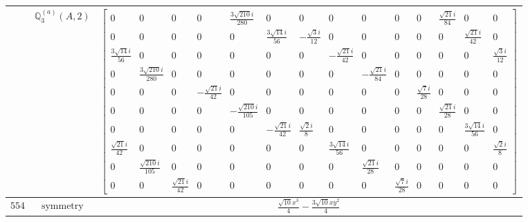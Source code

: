 \documentclass[fleqn,8pt,landscape]{jsarticle}
\begin{document}
\begin{longtable}{ccc}
$  $ & $ \mathbb{Q}_{3}^{(a)}(A,2) $ & $ \begin{bmatrix} 0 & 0 & 0 & 0 & \frac{3 \sqrt{210} i}{280} & 0 & 0 & 0 & 0 & 0 & 0 & \frac{\sqrt{21} i}{84} & 0 & 0 \\ 0 & 0 & 0 & 0 & 0 & \frac{3 \sqrt{14} i}{56} & - \frac{\sqrt{3} i}{12} & 0 & 0 & 0 & 0 & 0 & \frac{\sqrt{21} i}{42} & 0 \\ \frac{3 \sqrt{14} i}{56} & 0 & 0 & 0 & 0 & 0 & 0 & - \frac{\sqrt{21} i}{42} & 0 & 0 & 0 & 0 & 0 & \frac{\sqrt{3} i}{12} \\ 0 & \frac{3 \sqrt{210} i}{280} & 0 & 0 & 0 & 0 & 0 & 0 & - \frac{\sqrt{21} i}{84} & 0 & 0 & 0 & 0 & 0 \\ 0 & 0 & 0 & - \frac{\sqrt{21} i}{42} & 0 & 0 & 0 & 0 & 0 & 0 & \frac{\sqrt{7} i}{28} & 0 & 0 & 0 \\ 0 & 0 & 0 & 0 & - \frac{\sqrt{210} i}{105} & 0 & 0 & 0 & 0 & 0 & 0 & \frac{\sqrt{21} i}{28} & 0 & 0 \\ 0 & 0 & 0 & 0 & 0 & - \frac{\sqrt{21} i}{42} & \frac{\sqrt{2} i}{8} & 0 & 0 & 0 & 0 & 0 & \frac{3 \sqrt{14} i}{56} & 0 \\ \frac{\sqrt{21} i}{42} & 0 & 0 & 0 & 0 & 0 & 0 & \frac{3 \sqrt{14} i}{56} & 0 & 0 & 0 & 0 & 0 & \frac{\sqrt{2} i}{8} \\ 0 & \frac{\sqrt{210} i}{105} & 0 & 0 & 0 & 0 & 0 & 0 & \frac{\sqrt{21} i}{28} & 0 & 0 & 0 & 0 & 0 \\ 0 & 0 & \frac{\sqrt{21} i}{42} & 0 & 0 & 0 & 0 & 0 & 0 & \frac{\sqrt{7} i}{28} & 0 & 0 & 0 & 0 \end{bmatrix} $ \\ \hline
$ 554 $ & $ \text{symmetry} $ & $ \frac{\sqrt{10} x^{3}}{4} - \frac{3 \sqrt{10} x y^{2}}{4} $ \\

\end{longtable}
\end{document}
